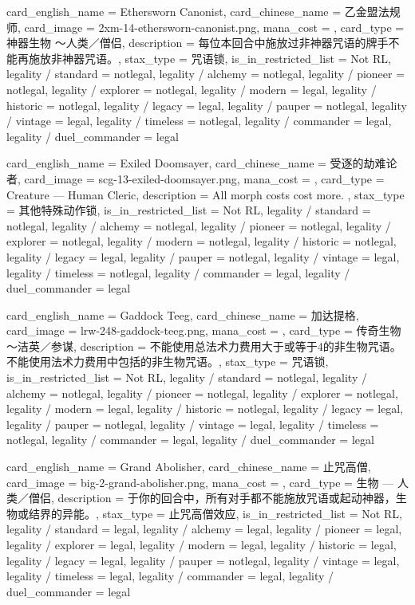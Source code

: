 \documentclass[lang = cn, color = black, 10pt]{AllThatStax}
\begin{document}
\card
{
	card_english_name = {Ethersworn Canonist},
	card_chinese_name = {乙金盟法规师},
	card_image = 2xm-14-ethersworn-canonist.png,
	mana_cost = ,
	card_type = 神器生物 ～人类／僧侣,
	description = {每位本回合中施放过非神器咒语的牌手不能再施放非神器咒语。},
	stax_type = 咒语锁,
	is_in_restricted_list = Not RL,
	legality / standard = notlegal,
	legality / alchemy = notlegal,
	legality / pioneer = notlegal,
	legality / explorer = notlegal,
	legality / modern = legal,
	legality / historic = notlegal,
	legality / legacy = legal,
	legality / pauper = notlegal,
	legality / vintage = legal,
	legality / timeless = notlegal,
	legality / commander = legal,
	legality / duel_commander = legal
}

\card
{
	card_english_name = {Exiled Doomsayer},
	card_chinese_name = {受逐的劫难论者},
	card_image = scg-13-exiled-doomsayer.png,
	mana_cost = ,
	card_type = Creature — Human Cleric,
	description = {All morph costs cost  more. },
	stax_type = 其他特殊动作锁,
	is_in_restricted_list = Not RL,
	legality / standard = notlegal,
	legality / alchemy = notlegal,
	legality / pioneer = notlegal,
	legality / explorer = notlegal,
	legality / modern = notlegal,
	legality / historic = notlegal,
	legality / legacy = legal,
	legality / pauper = notlegal,
	legality / vintage = legal,
	legality / timeless = notlegal,
	legality / commander = legal,
	legality / duel_commander = legal
}

\card
{
	card_english_name = {Gaddock Teeg},
	card_chinese_name = {加达提格},
	card_image = lrw-248-gaddock-teeg.png,
	mana_cost = ,
	card_type = 传奇生物～洁英／参谋,
	description = {不能使用总法术力费用大于或等于4的非生物咒语。\\
		不能使用法术力费用中包括的非生物咒语。},
	stax_type = 咒语锁,
	is_in_restricted_list = Not RL,
	legality / standard = notlegal,
	legality / alchemy = notlegal,
	legality / pioneer = notlegal,
	legality / explorer = notlegal,
	legality / modern = legal,
	legality / historic = notlegal,
	legality / legacy = legal,
	legality / pauper = notlegal,
	legality / vintage = legal,
	legality / timeless = notlegal,
	legality / commander = legal,
	legality / duel_commander = legal
}

\card
{
	card_english_name = {Grand Abolisher},
	card_chinese_name = {止咒高僧},
	card_image = big-2-grand-abolisher.png,
	mana_cost = ,
	card_type = 生物 — 人类／僧侣,
	description = {于你的回合中，所有对手都不能施放咒语或起动神器，生物或结界的异能。},
	stax_type = 止咒高僧效应,
	is_in_restricted_list = Not RL,
	legality / standard = legal,
	legality / alchemy = legal,
	legality / pioneer = legal,
	legality / explorer = legal,
	legality / modern = legal,
	legality / historic = legal,
	legality / legacy = legal,
	legality / pauper = notlegal,
	legality / vintage = legal,
	legality / timeless = legal,
	legality / commander = legal,
	legality / duel_commander = legal
}
\end{document}
